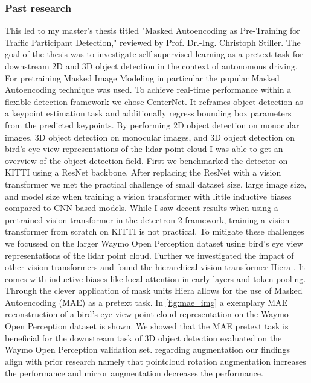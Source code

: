 


 \subsubsection{Past research}

This led to my master's thesis titled "Masked Autoencoding as Pre-Training for Traffic Participant Detection," 
reviewed by Prof. Dr.-Ing. Christoph Stiller.
The goal of the thesis was to investigate self-supervised learning as a pretext task for downstream 2D and 3D object detection in the context 
of autonomous driving. For pretraining Masked Image Modeling in particular the popular Masked Autoencoding \cite{mae} technique was used. To achieve real-time performance within a flexible detection framework we chose CenterNet. It reframes 
object detection as a keypoint estimation task and additionally regress bounding box parameters from the predicted keypoints.
By performing 2D object detection on monocular images, 3D object detection on monocular images, and 3D object detection on bird's eye view
representations of the  lidar point cloud I was able to get an overview of the object detection field.
First we benchmarked the detector on KITTI using a ResNet backbone. After replacing the ResNet with a vision transformer we met 
the practical challenge of small dataset size, large image size, and model size when training a vision transformer with little 
inductive biases compared to CNN-based models.
While I saw decent results when using a pretrained vision transformer in the detectron-2 framework,
training a vision transformer from scratch on KITTI is not practical.
To mitigate these challenges we focussed on the larger Waymo Open Perception dataset using 
bird's eye view representations of the lidar point cloud. Further we investigated the impact of other vision transformers and found 
the hierarchical vision transformer Hiera \cite{hiera}. It comes with inductive biases like local attention in early layers and 
token pooling. Through the clever application of mask units Hiera allows for 
the use of Masked Autoencoding (MAE) as a pretext task. In \autoref{fig:mae_img} a exemplary MAE reconstruction of a 
bird's eye view point cloud representation
on the Waymo Open Perception dataset is shown. We showed that the 
MAE pretext task is beneficial for the downstream task of 3D object detection evaluated on the Waymo Open Perception validation set. 
regarding augmentation our findings align with 
prior research namely that pointcloud rotation augmentation increases the performance and mirror augmentation decreases the performance.

